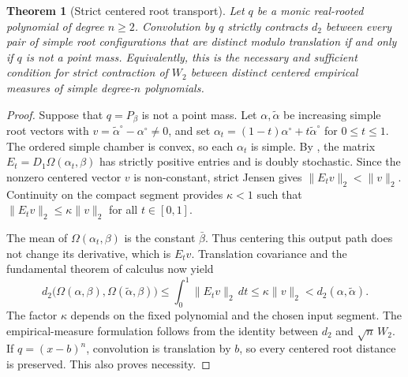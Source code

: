 \documentclass[12pt,reqno]{amsart}
\newtheorem{theorem}{Theorem}[section]
\theoremstyle{definition}
\theoremstyle{remark}
\begin{document}
\begin{theorem}[Strict centered root transport]
\label{thm:strict-root-transport}
Let \(q\) be a monic real-rooted polynomial of degree \(n\geq2\).
Convolution by \(q\) strictly contracts \(d_2\) between every pair of
simple root configurations that are distinct modulo translation if and
only if \(q\) is not a point mass.  Equivalently, this is the necessary
and sufficient condition for strict contraction of \(W_2\) between
distinct centered empirical measures of simple degree-\(n\) polynomials.
\end{theorem}

\begin{proof}
Suppose that \(q=P_\beta\) is not a point mass.  Let
\(\alpha,\widetilde\alpha\) be increasing simple root vectors with
\(v=\widetilde\alpha^\circ-\alpha^\circ\ne0\), and set
\(\alpha_t=(1-t)\alpha^\circ+t\widetilde\alpha^\circ\) for
\(0\leq t\leq1\).  The ordered simple chamber is convex, so each
\(\alpha_t\) is simple.  By
, the matrix
\(E_t=D_1\Omega(\alpha_t,\beta)\) has strictly positive entries and is
doubly stochastic.  Since the nonzero centered vector \(v\) is
non-constant, strict Jensen gives \(\|E_tv\|_2<\|v\|_2\).
Continuity on the compact segment provides \(\kappa<1\) such that
\(\|E_tv\|_2\leq\kappa\|v\|_2\) for all \(t\in[0,1]\).

The mean of \(\Omega(\alpha_t,\beta)\) is the constant \(\bar\beta\).
Thus centering this output path does not change its derivative, which
is \(E_tv\).  Translation covariance and the fundamental theorem of
calculus now yield
\begin{equation}\label{eq:strict-transport-segment}
 d_2\bigl(\Omega(\alpha,\beta),
          \Omega(\widetilde\alpha,\beta)\bigr)
 \leq\int_0^1\|E_tv\|_2\,dt
 \leq\kappa\|v\|_2
 <d_2(\alpha,\widetilde\alpha).
\end{equation}
The factor \(\kappa\) depends on the fixed polynomial and the chosen
input segment.  The empirical-measure formulation follows from the
identity between \(d_2\) and \(\sqrt n\,W_2\).
If \(q=(x-b)^n\), convolution is translation by \(b\), so every centered
root distance is preserved.  This also proves necessity.
\end{proof}
\end{document}
